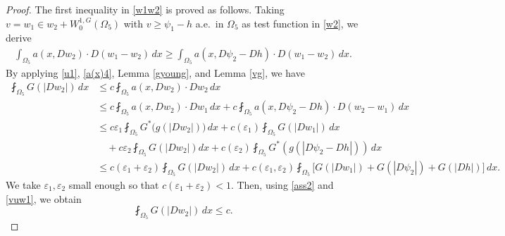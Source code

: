 \documentclass[10pt,a4paper]{article}
\theoremstyle{definition}
\numberwithin{equation}{section}
\begin{document}
	 \begin{proof}
	The first inequality in \eqref{w1w2} is proved as follows.
	 Taking $v=w_1\in w_2+W_0^{1,G}(\Omega_5)$ with
	 $v\geqslant\psi_1-h$ a.e.\ in $\Omega_5$
	 as test function in \eqref{w2}, we derive
	 \begin{align}\label{w22}
	 	 \int_{\Omega_5}a(x,Dw_2)\cdot D(w_1-w_2)\,dx
	 	\geqslant
	 	\int_{\Omega_5}a(x,D\psi_{2}-Dh)\cdot D(w_1-w_2)\,dx.
	 \end{align}
	 By applying \eqref{u1}, \eqref{a(x)4}, Lemma \ref{gyoung},
	 and Lemma \ref{vg}, we have
	 \begin{align*}
	 	\fint_{\Omega_5}G(|Dw_2|)\,dx
	 	&\leqslant  
	 	c\fint_{\Omega_5}a(x,Dw_2)\cdot Dw_2\,dx
	 	\\
	 	&\leqslant
	 	c\fint_{\Omega_5}a(x,Dw_2)\cdot Dw_1\,dx
	 	+
	 	c\fint_{\Omega_5}a(x,D\psi_{2}-Dh)\cdot D(w_2-w_1)\,dx
	 	\\
	 	&\leqslant
	 	c\varepsilon_1\fint_{\Omega_5}G^{*}\bigl(g(|Dw_2|)\bigr)\,dx
	 	+
	 	c(\varepsilon_1)\fint_{\Omega_5}G(|Dw_1|)\,dx
	 	\\
	 	&\quad+
	 	c\varepsilon_2\fint_{\Omega_5}G(|Dw_2|)dx
	 	+
	 	c(\varepsilon_2)\fint_{\Omega_5}G^*(g(|D\psi_{2}-Dh|))\,dx
	 	\\
	 	&\leqslant
	 	c(\varepsilon_1+\varepsilon_2)\fint_{\Omega_5}G(|Dw_2|)\,dx
	 	+
	 	c(\varepsilon_1,\varepsilon_2)
	 	\fint_{\Omega_5}\bigl[G(|Dw_1|)+G(|D\psi_{2}|)+G(|Dh|)\bigr]\,dx.
	 \end{align*}
	 We take $\varepsilon_1,\varepsilon_2$ small enough so that
	 $c(\varepsilon_1+\varepsilon_2)<1$.
	 Then, using \eqref{ass2} and \eqref{vuw1}, we obtain
	 \[
	 \fint_{\Omega_5}G(|Dw_2|)\,dx\leqslant c.
	 \]
	 

\end{proof}
\end{document}
